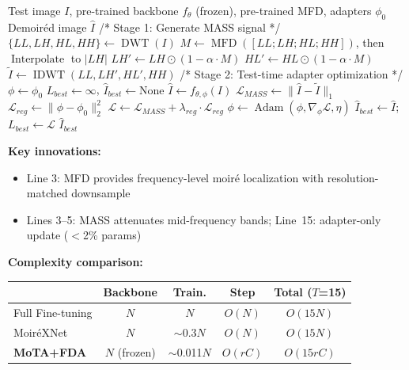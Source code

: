 \documentclass[10pt,twocolumn,letterpaper]{article}
\begin{document}
\begin{algorithm}[H]
\caption{MoTA --- Moir\'{e} Test-Time Adaptation}
\label{alg:mota}
\begin{algorithmic}[1]
\REQUIRE Test image $I$, pre-trained backbone $f_\theta$ (frozen), pre-trained MFD, adapters $\phi_0$
\ENSURE Demoir\'{e}d image $\hat{I}$
\STATE /* Stage 1: Generate MASS signal */
\STATE $\{LL, LH, HL, HH\} \leftarrow \operatorname{DWT}(I)$ 
\STATE $M \leftarrow \operatorname{MFD}([LL; LH; HL; HH])$, then $\operatorname{Interpolate}$ to $|LH|$ 
\STATE $LH' \leftarrow LH \odot (1 - \alpha \cdot M)$ 
\STATE $HL' \leftarrow HL \odot (1 - \alpha \cdot M)$
\STATE $\tilde{I} \leftarrow \operatorname{IDWT}(LL, LH', HL', HH)$ 
\STATE /* Stage 2: Test-time adapter optimization */
\STATE $\phi \leftarrow \phi_0$ 
\STATE $L_{best} \leftarrow \infty$, $\hat{I}_{best} \leftarrow \text{None}$ 
    \STATE $\hat{I} \leftarrow f_{\theta,\phi}(I)$ 
    \STATE $\mathcal{L}_{MASS} \leftarrow \|\hat{I} - \tilde{I}\|_1$ 
    \STATE $\mathcal{L}_{reg} \leftarrow \|\phi - \phi_0\|_2^2$ 
    \STATE $\mathcal{L} \leftarrow \mathcal{L}_{MASS} + \lambda_{reg} \cdot \mathcal{L}_{reg}$
    \STATE $\phi \leftarrow \operatorname{Adam}(\phi, \nabla_\phi \mathcal{L}, \eta)$ 
        \STATE $\hat{I}_{best} \leftarrow \hat{I}$; $L_{best} \leftarrow \mathcal{L}$ 
    \ENDIF
\ENDFOR
\STATE \RETURN $\hat{I}_{best}$
\end{algorithmic}

\vspace{0.5em}
\textbf{Key innovations:}
\begin{itemize}
    \item Line 3: MFD provides frequency-level moir\'{e} localization with resolution-matched downsample
    \item Lines 3--5: MASS attenuates mid-frequency bands; Line~15: adapter-only update ($<$2\% params)
\end{itemize}
\end{algorithm}

\textbf{Complexity comparison:}
\begin{center}
\footnotesize
\setlength{\tabcolsep}{2.5pt}
\begin{tabular}{@{}lcccc@{}}
\toprule
 & Backbone & Train. & Step & Total ($T$=15) \\
\midrule
Full Fine-tuning & $N$ & $N$ & $O(N)$ & $O(15N)$ \\
Moir\'{e}XNet & $N$ & $\sim$0.3$N$ & $O(N)$ & $O(15N)$ \\
\textbf{MoTA+FDA} & $N$ (frozen) & $\sim$0.011$N$ & $O(rC)$ & $O(15rC)$ \\
\bottomrule
\end{tabular}
\end{center}
\end{document}
